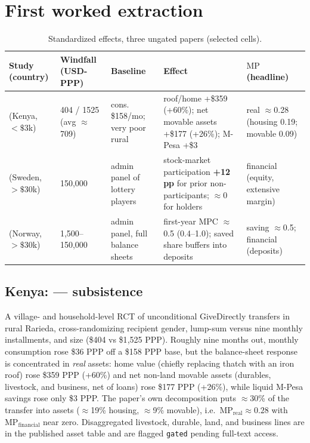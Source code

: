\documentclass[11pt,a4paper]{article}
\newcommand{\mpx}{\mathrm{MP}}
\begin{document}
\section{First worked extraction}

\begin{table}[h]\centering\small
\caption{Standardized effects, three ungated papers (selected cells).}
\begin{tabular}{@{}p{2.6cm}p{1.5cm}p{1.6cm}p{3.0cm}p{2.4cm}@{}}
\toprule
Study (country) & Windfall (USD-PPP) & Baseline & Effect & $\mpx$ (headline) \\
\midrule
\citet{haushofer2016short} (Kenya, $<\!\$3$k) & 404 / 1525 (avg $\approx$709) &
cons. \$158/mo; very poor rural & roof/home +\$359 (+60\%); net movable assets
+\$177 (+26\%); M-Pesa +\$3 & real $\approx$0.28 (housing 0.19; movable 0.09) \\
\addlinespace
\citet{briggs2021windfall} (Sweden, $>\!\$30$k) & 150{,}000 & admin panel of lottery
players & stock-market participation \textbf{+12 pp} for prior non-participants;
$\approx$0 for holders & financial (equity, extensive margin) \\
\addlinespace
\citet{fagereng2021mpc} (Norway, $>\!\$30$k) & 1{,}500--150{,}000 & admin panel,
full balance sheets & first-year MPC $\approx$0.5 (0.4--1.0); saved share buffers
into deposits & saving $\approx$0.5; financial (deposits) \\
\bottomrule
\end{tabular}
\end{table}

\subsection{Kenya: \citet{haushofer2016short} --- subsistence}
A village- and household-level RCT of unconditional GiveDirectly transfers in
rural Rarieda, cross-randomizing recipient gender, lump-sum versus nine monthly
installments, and size (\$404 vs \$1{,}525 PPP). Roughly nine months out,
monthly consumption rose \$36 PPP off a \$158 PPP base, but the balance-sheet
response is concentrated in \emph{real} assets: home value (chiefly replacing
thatch with an iron roof) rose \$359 PPP (+60\%) and net non-land movable assets
(durables, livestock, and business, net of loans) rose \$177 PPP (+26\%), while
liquid M-Pesa savings rose only \$3 PPP. The paper's own decomposition puts
$\approx$30\% of the transfer into assets ($\approx$19\% housing, $\approx$9\%
movable), i.e.\ $\mpx_{\text{real}} \approx 0.28$ with $\mpx_{\text{financial}}$
near zero. Disaggregated livestock, durable, land, and business lines are in the
published asset table and are flagged \texttt{gated} pending full-text access.
\end{document}
